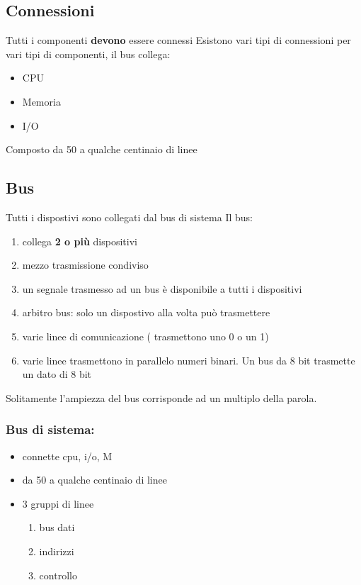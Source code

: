 \documentclass[12pt, a4paper]{article}
\begin{document}
\subsection{Connessioni}
Tutti i componenti \textbf{devono} essere connessi \newline
Esistono vari tipi di connessioni per vari tipi di componenti, il bus collega:
\begin{itemize}
	\item CPU
	\item Memoria 
	\item I/O
\end{itemize}
Composto da 50 a qualche centinaio di linee
\subsection{Bus}
Tutti i dispostivi sono collegati dal bus di sistema \newline
Il bus:
\begin{enumerate}
	\item collega \textbf{2 o più} dispositivi
	\item mezzo trasmissione condiviso
	\item un segnale trasmesso ad un bus è disponibile a tutti i dispositivi
	\item arbitro bus: solo un dispostivo alla volta può trasmettere
	\item varie linee di comunicazione ( trasmettono uno 0 o un 1)
	\item varie linee trasmettono in parallelo numeri binari. 
		Un bus da 8 bit trasmette un dato di 8 bit
\end{enumerate}
Solitamente l'ampiezza del bus corrisponde ad un multiplo della parola.

\subsubsection{Bus di sistema:}
\begin{itemize}
	\item connette cpu, i/o, M
	\item da 50 a qualche centinaio di linee
	\item 3 gruppi di linee
	\begin{enumerate}
		\item bus dati
		\item indirizzi
		\item controllo
	\end{enumerate}
\end{itemize}
\end{document}
